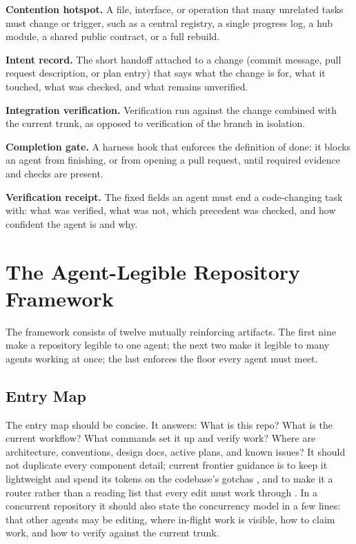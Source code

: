 \documentclass[11pt]{article}
\begin{document}
\textbf{Contention hotspot.} A file, interface, or operation that many unrelated tasks must change or trigger, such as a central registry, a single progress log, a hub module, a shared public contract, or a full rebuild.

\textbf{Intent record.} The short handoff attached to a change (commit message, pull request description, or plan entry) that says what the change is for, what it touched, what was checked, and what remains unverified.

\textbf{Integration verification.} Verification run against the change combined with the current trunk, as opposed to verification of the branch in isolation.

\textbf{Completion gate.} A harness hook that enforces the definition of done: it blocks an agent from finishing, or from opening a pull request, until required evidence and checks are present.

\textbf{Verification receipt.} The fixed fields an agent must end a code-changing task with: what was verified, what was not, which precedent was checked, and how confident the agent is and why.

\section{The Agent-Legible Repository Framework}
The framework consists of twelve mutually reinforcing artifacts. The first nine make a repository legible to one agent; the next two make it legible to many agents working at once; the last enforces the floor every agent must meet.

\subsection{Entry Map}
The entry map should be concise. It answers: What is this repo? What is the current workflow? What commands set it up and verify work? Where are architecture, conventions, design docs, active plans, and known issues? It should not duplicate every component detail; current frontier guidance is to keep it lightweight and spend its tokens on the codebase's gotchas \cite{shihipar2026context}, and to make it a router rather than a reading list that every edit must work through \cite{provencher2026astra}. In a concurrent repository it should also state the concurrency model in a few lines: that other agents may be editing, where in-flight work is visible, how to claim work, and how to verify against the current trunk.
\end{document}

